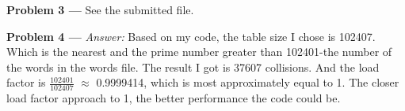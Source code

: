 \documentclass[11pt]{article}
\newcommand{\problem}[1]{\vspace*{2ex}\textbf{Problem #1 ---} }
\begin{document}
\begin{center}
\end{center}

\problem{3}
See the submitted file.
\newpage

\problem{4}\textit{Answer:}
Based on my code, the table size I chose is 102407. Which is the nearest and the prime number greater than 102401-the number of the words in the words file. The result I got is 37607 collisions. And the load factor is $\frac{102401}{102407}$ $\approx$ 0.9999414, which is most approximately equal to 1. The closer load factor approach to 1, the better performance the code could be.
\end{document}
